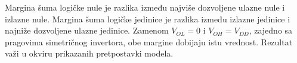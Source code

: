 Margina šuma logičke nule je razlika između najviše dozvoljene ulazne nule i izlazne nule. Margina šuma logičke jedinice je razlika između izlazne jedinice i najniže dozvoljene ulazne jedinice. Zamenom $V_{OL}=0$ i $V_{OH}=V_{DD}$, zajedno sa pragovima simetričnog invertora, obe margine dobijaju istu vrednost. Rezultat važi u okviru prikazanih pretpostavki modela.
